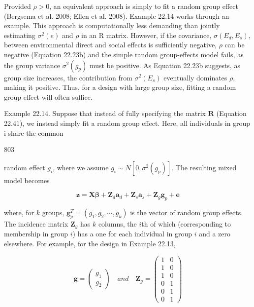 \documentclass{article}
\begin{document}
Provided  $ \rho > 0 $, an equivalent approach is simply to fit a random group effect (Bergsema et al. 2008; Ellen et al. 2008). Example 22.14 works through an example. This approach is computationally less demanding than jointly estimating  $ \sigma^2(e) $ and  $ \rho $ in an R matrix. However, if the covariance,  $ \sigma(E_d, E_s) $, between environmental direct and social effects is sufficiently negative,  $ \rho $ can be negative (Equation 22.23b) and the simple random group-effects model fails, as the group variance  $ \sigma^2(g_p) $ must be positive. As Equation 22.23b suggests, as group size increases, the contribution from  $ \sigma^2(E_s) $ eventually dominates  $ \rho $, making it positive. Thus, for a design with large group size, fitting a random group effect will often suffice.

Example 22.14. Suppose that instead of fully specifying the matrix  $ \mathbf{R} $ (Equation 22.41), we instead simply fit a random group effect. Here, all individuals in group i share the common

803

random effect  $ g_i $, where we assume  $ g_i \sim N[0, \sigma^2(g_p)] $. The resulting mixed model becomes

\begin{equation}
\mathbf{z}=\mathbf{X}\boldsymbol{\beta}+\mathbf{Z}_{d}\mathbf{a}_{d}+\mathbf{Z}_{s}\mathbf{a}_{s}+\mathbf{Z}_{g}\mathbf{g}_{p}+\mathbf{e}
\end{equation}

where, for $k$ groups, $\mathbf{g}_p^T = (g_1, g_2, \cdots, g_k)$ is the vector of random group effects. The incidence matrix $\mathbf{Z}_g$ has $k$ columns, the $i$th of which (corresponding to membership in group $i$) has a one for each individual in group $i$ and a zero elsewhere. For example, for the design in Example 22.13,

\begin{equation}
\mathbf{g}=\begin{pmatrix}{{{g_{1}}}} \\{{{g_{2}}}}\end{pmatrix}\quad and\quad\mathbf{Z}_{g}=\begin{pmatrix}{{{1}}}&{{{0}}} \\{{{1}}}&{{{0}}} \\{{{1}}}&{{{0}}} \\{{{0}}}&{{{1}}} \\{{{0}}}&{{{1}}} \\{{{0}}}&{{{1}}}\end{pmatrix}
\end{equation}
\end{document}
